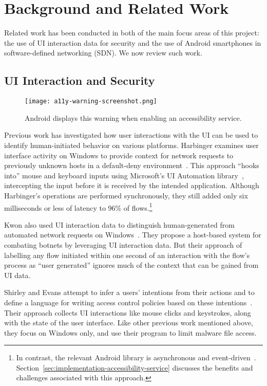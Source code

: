\section{Background and Related Work}
\label{sec:related-work}

Related work has been conducted in both of the main focus areas of this project:
the use of UI interaction data for security and the use of Android smartphones
in software-defined networking (SDN). We now review such work.

\subsection{UI Interaction and Security}
\label{sec:ui-interaction-and-security}

\begin{wrapfigure}{R}{0.4\textwidth}
	\centering
	\texttt{[image: a11y-warning-screenshot.png]}
	\caption{Android displays this warning when enabling an accessibility
		service.}
	\label{fig:a11y-warning}
\end{wrapfigure}

Previous work has investigated how user interactions with the UI can be used to
identify human-initiated behavior on various platforms. Harbinger examines user
interface activity on Windows to provide context for network requests to
previously unknown hosts in a default-deny environment~\cite{chuluundorj2019}.
This approach ``hooks into'' mouse and keyboard inputs using Microsoft's UI
Automation library~\cite{microsoft2018}, intercepting the input before it is
received by the intended application. Although Harbinger's operations are
performed synchronously, they still added only six milliseconds or less of
latency to 96\% of flows.\footnote{In contrast, the relevant Android library is
	asynchronous and event-driven~\cite{googledevelopers2020}.
	Section~\ref{sec:implementation-accessibility-service} discusses the
	benefits and challenges associated with this approach.}

Kwon \etal also used UI interaction data to distinguish human-generated from
automated network requests on Windows~\cite{kwon2011}. They propose a host-based
system for combating botnets by leveraging UI interaction data. But their
approach of labelling any flow initiated within one second of an interaction
with the flow's process as ``user generated'' ignores much of the context that
can be gained from UI data.

Shirley and Evans attempt to infer a users' intentions from their actions and to
define a language for writing access control policies based on these
intentions~\cite{shirley2008}. Their approach collects UI interactions like
mouse clicks and keystrokes, along with the state of the user interface. Like
other previous work mentioned above, they focus on Windows only, and use their
program to limit malware file access.

